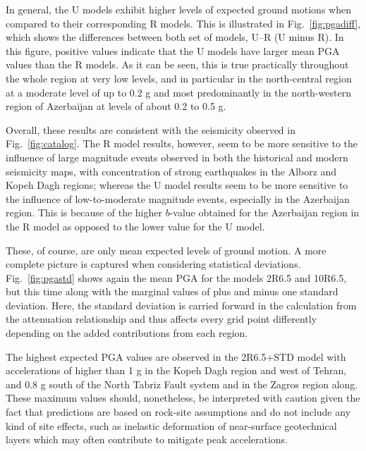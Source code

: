 In general, the U models exhibit higher levels of expected ground motions when compared to their corresponding R models. This is illustrated in Fig.~\ref{fig:pgadiff}, which shows the differences between both set of models, U--R (U minus R). In this figure, positive values indicate that the U models have larger mean PGA values than the R models. As it can be seen, this is true practically throughout the whole region at very low levels, and in particular in the north-central region at a moderate level of up to 0.2 g and most predominantly in the north-western region of Azerbaijan at levels of about 0.2 to 0.5 g.

Overall, these results are consistent with the seismicity observed in Fig.~\ref{fig:catalog}. The R model results, however, seem to be more sensitive to the influence of large magnitude events observed in both the historical and modern seismicity maps, with concentration of strong earthquakes in the Alborz and Kopeh Dagh regions; whereas the U model results seem to be more sensitive to the influence of low-to-moderate magnitude events, especially in the Azerbaijan region. This is because of the higher $b$-value obtained for the Azerbaijan region in the R model as opposed to the lower value for the U model.

These, of course, are only mean expected levels of ground motion. A more complete picture is captured when considering statistical deviations. Fig.~\ref{fig:pgastd} shows again the mean PGA for the models 2R6.5 and 10R6.5, but this time along with the marginal values of plus and minus one standard deviation. Here, the standard deviation is carried forward in the calculation from the attenuation relationship and thus affects every grid point differently depending on the added contributions from each region. 

The highest expected PGA values are observed in the 2R6.5+STD model with accelerations of higher than 1 g in the Kopeh Dagh region and west of Tehran, and 0.8 g south of the North Tabriz Fault system and in the Zagros region along. These maximum values should, nonetheless, be interpreted with caution given the fact that predictions are based on rock-site assumptions and do not include any kind of site effects, such as inelastic deformation of near-surface geotechnical layers which may often contribute to mitigate peak accelerations.

